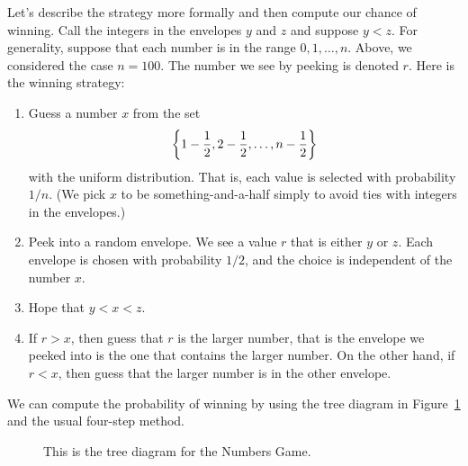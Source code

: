 \documentclass[11pt,twoside]{article}
\begin{document}
Let's describe the strategy more formally and then compute our chance
of winning.  Call the integers in the envelopes $y$ and $z$ and suppose
$y < z$.  For generality, suppose that each number is in the range $0,
1, \ldots, n$.  Above, we considered the case $n = 100$.  The number
we see by peeking is denoted $r$.  Here is the winning strategy:
\begin{enumerate}
\item Guess a number $x$ from the set
\[
\left\{ 1-\frac{1}{2}, 2-\frac{1}{2}, \dots, n - \frac{1}{2} \right\}
\]
with the uniform distribution.  That is, each value is selected with
probability $1/n$.  (We pick $x$ to be something-and-a-half simply to
avoid ties with integers in the envelopes.)

\item Peek into a random envelope.  We see a value $r$ that is either
$y$ or $z$.  Each envelope is chosen with probability $1/2$,
and the choice is independent of the number $x$.

\item Hope that $y < x < z$.  

\item If $r > x$, then guess that $r$ is the larger number, that is
the envelope we peeked into is the one that contains the larger
number. 
On the other hand, if $r < x$, then guess that the larger number is in
the other envelope.
\end{enumerate}

We can compute the probability of winning by using the tree diagram in
Figure~\ref{fig:game100} and the usual four-step method.
\begin{figure}
  \centerline{}
  \caption{This is the tree diagram for the Numbers Game.}
  \label{fig:game100}
\end{figure}
\end{document}
